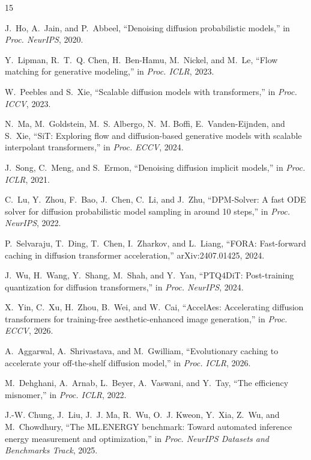 \documentclass[conference]{IEEEtran}
\begin{document}
\begin{thebibliography}{15}

J.~Ho, A.~Jain, and P.~Abbeel, ``Denoising diffusion probabilistic models,'' in \emph{Proc. NeurIPS}, 2020.

Y.~Lipman, R.~T.~Q. Chen, H.~Ben-Hamu, M.~Nickel, and M.~Le, ``Flow matching for generative modeling,'' in
\emph{Proc. ICLR}, 2023.

W.~Peebles and S.~Xie, ``Scalable diffusion models with transformers,'' in \emph{Proc. ICCV}, 2023.

N.~Ma, M.~Goldstein, M.~S. Albergo, N.~M. Boffi, E.~Vanden-Eijnden, and S.~Xie, ``SiT: Exploring flow and
diffusion-based generative models with scalable interpolant transformers,'' in \emph{Proc. ECCV}, 2024.

J.~Song, C.~Meng, and S.~Ermon, ``Denoising diffusion implicit models,'' in \emph{Proc. ICLR}, 2021.

C.~Lu, Y.~Zhou, F.~Bao, J.~Chen, C.~Li, and J.~Zhu, ``DPM-Solver: A fast ODE solver for diffusion probabilistic
model sampling in around 10 steps,'' in \emph{Proc. NeurIPS}, 2022.

P.~Selvaraju, T.~Ding, T.~Chen, I.~Zharkov, and L.~Liang, ``FORA: Fast-forward caching in diffusion
transformer acceleration,'' arXiv:2407.01425, 2024.

J.~Wu, H.~Wang, Y.~Shang, M.~Shah, and Y.~Yan, ``PTQ4DiT: Post-training quantization for diffusion
transformers,'' in \emph{Proc. NeurIPS}, 2024.

X.~Yin, C.~Xu, H.~Zhou, B.~Wei, and W.~Cai, ``AccelAes: Accelerating diffusion transformers for training-free
aesthetic-enhanced image generation,'' in \emph{Proc. ECCV}, 2026.

A.~Aggarwal, A.~Shrivastava, and M.~Gwilliam, ``Evolutionary caching to accelerate your off-the-shelf
diffusion model,'' in \emph{Proc. ICLR}, 2026.

M.~Dehghani, A.~Arnab, L.~Beyer, A.~Vaswani, and Y.~Tay, ``The efficiency misnomer,'' in \emph{Proc. ICLR},
2022.

J.-W. Chung, J.~Liu, J.~J. Ma, R.~Wu, O.~J. Kweon, Y.~Xia, Z.~Wu, and M.~Chowdhury, ``The ML.ENERGY
benchmark: Toward automated inference energy measurement and optimization,'' in \emph{Proc. NeurIPS Datasets
and Benchmarks Track}, 2025.


\end{thebibliography}
\end{document}
